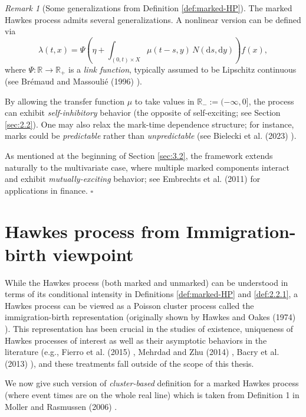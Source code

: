 \documentclass[12pt,a4paper]{report}
\theoremstyle{plain}
\theoremstyle{definition}
\theoremstyle{remark}
\newtheorem{remark}{Remark}[section]
\newcommand{\1}{\mathbf{1}}
\begin{document}
\begin{remark}[Some generalizations from Definition \ref{def:marked-HP}]
\medskip
\noindent
The marked Hawkes process admits several generalizations. A nonlinear version can be defined via
\[
\lambda(t,x) = \Psi\left( \eta + \int_{(0,t)\times X} \mu(t-s,y) \, N(\mathrm{d}s,\mathrm{d}y) \right) f(x),
\]
where $\Psi: \mathbb{R} \to \mathbb{R}_+$ is a \emph{link function}, typically assumed to be Lipschitz continuous (see Brémaud and Massoulié (1996) \cite{BM96}).

\medskip
\noindent
By allowing the transfer function $\mu$ to take values in $\mathbb{R}_- := (-\infty,0]$, the process can exhibit \emph{self-inhibitory} behavior (the opposite of self-exciting; see Section \ref{sec:2.2}). One may also relax the mark-time dependence structure; for instance, marks could be \emph{predictable} rather than \emph{unpredictable} (see Bielecki et al. (2023) \cite{BNJ23}).

\medskip
\noindent
As mentioned at the beginning of Section \ref{sec:3.2}, the framework extends naturally to the multivariate case, where multiple marked components interact and exhibit \emph{mutually-exciting} behavior; see Embrechts et al. (2011) \cite{Emb11} for applications in finance.
\hfill $\square$
\end{remark}

\chapter{Hawkes process from Immigration-birth viewpoint}\label{chap:4}
While the Hawkes process (both marked and unmarked) can be understood in terms of its conditional intensity in Definitions \eqref{def:marked-HP} and \eqref{def:2.2.1},
a Hawkes process can be viewed as a Poisson cluster process called the immigration-birth representation (originally shown by Hawkes and Oakes (1974) \cite{HO74}).
This representation has been crucial in the studies of existence, uniqueness of Hawkes processes of interest as well as their asymptotic behaviors in the literature (e.g., Fierro et al. (2015) \cite{Fie15}, Mehrdad and Zhu (2014) \cite{MZ14}, Bacry et al. (2013) \cite{Bac13}), and these treatments fall outside of the scope of this thesis.

\medskip
\noindent
We now give such version of  \emph{cluster-based} definition for a marked Hawkes process (where event times are on the whole real line) which is taken from Definition 1 in Moller and Rasmussen (2006) \cite{MR06}.
\end{document}
